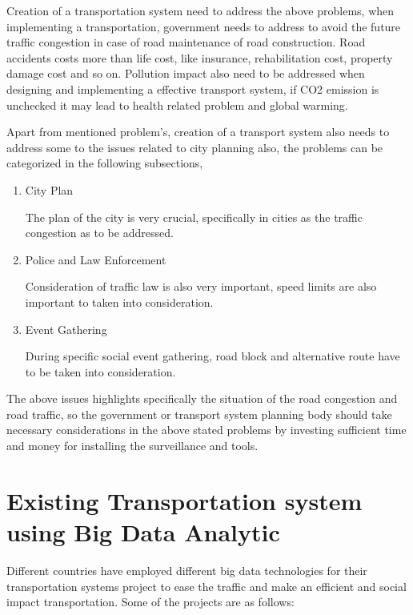 \documentclass[sigconf]{acmart}
\begin{document}
Creation of a transportation system need to address the above problems, when implementing a transportation, government needs to address to avoid the future traffic congestion in case of road maintenance of road construction. Road accidents costs more than life cost, like insurance, rehabilitation cost, property damage cost and so on. Pollution impact also need to be addressed when designing and implementing a effective transport system, if CO2 emission is unchecked it may lead to health related problem and global warming.

Apart from mentioned problem's, creation of a transport system also needs to address some to the issues related to city planning also, the problems can be categorized in the following subsections,

\begin{enumerate}
\item City Plan 

The plan of the city is very crucial, specifically in cities as the traffic congestion as to be addressed. 

\item Police and Law Enforcement 

Consideration of traffic law is also very important, speed limits are also important to taken into consideration.

\item Event Gathering 

During specific social event gathering, road block and alternative route have to be taken into consideration.

\end{enumerate}

The above issues highlights specifically the situation of the road congestion and road traffic, so the government or transport system planning body should take necessary considerations in the above stated problems by investing sufficient time and money for installing the surveillance and tools. 


\section{Existing Transportation system using Big Data Analytic}

Different countries have employed different big data technologies for their transportation systems project to ease the traffic and make an efficient and social impact transportation. Some of the projects are as follows:
\end{document}
